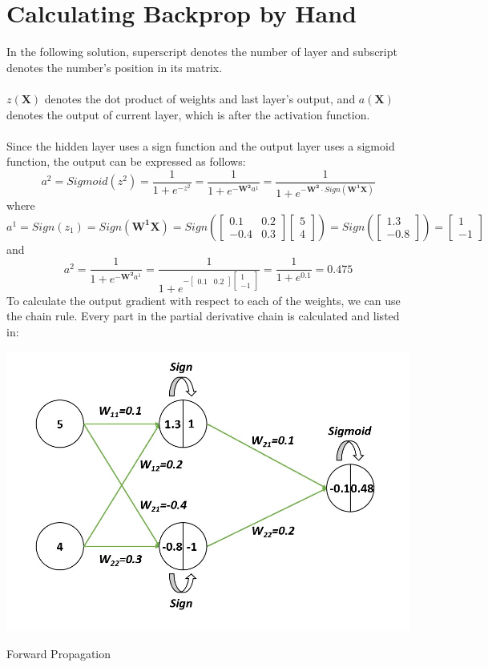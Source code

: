 \documentclass{article}
\begin{document}
    \section{Calculating Backprop by Hand}
    	In the following solution, superscript denotes the number of layer and subscript denotes the number's position in its matrix. \\\\
    	$z(\boldsymbol{X})$ denotes the dot product of weights and last layer's output, and $a(\boldsymbol{X})$ denotes the output of current layer, which is after the activation function.\\\\
    	Since the hidden layer uses a sign function and the output layer uses a sigmoid function, the output can be expressed as follows:
    	$$a^2=
    	Sigmoid(z^2)=
    	\dfrac{1}{1+e^{-z^2}}=
    	\dfrac{1}{1+e^{-\boldsymbol{W^2}a^1}}=
    	\dfrac{1}{1+e^{-\boldsymbol{W^2}\cdot Sign(\boldsymbol{W^1}\boldsymbol{X})}}$$
    	where
    	$$a^1=
    	Sign(z_1)=
    	Sign(\boldsymbol{W^1}\boldsymbol{X})=
    	Sign(\begin{bmatrix}0.1 & 0.2\\-0.4 & 0.3\end{bmatrix} \begin{bmatrix}5\\4\end{bmatrix})=
    	Sign(\begin{bmatrix}1.3\\-0.8\end{bmatrix})=
    	\begin{bmatrix}1\\-1\end{bmatrix}$$
    	and
    	$$a^2=
    	\dfrac{1}{1+e^{-\boldsymbol{W^2}a^1}}=
    	\dfrac{1}{1+e^{-\begin{bmatrix}0.1&0.2\end{bmatrix}\begin{bmatrix}1\\-1\end{bmatrix}}}=
    	\dfrac{1}{1+e^{0.1}}=0.475$$
    	To calculate the output gradient with respect to each of the weights, we can use the chain rule. Every part in the partial derivative chain is calculated and listed in:\\
    	\begin{minipage}[t]{\linewidth}
        		\captionsetup{type=figure}
               	\centering
               	\includegraphics[width=0.6\linewidth]
                				{images/Q2a.jpg}
                \caption{Forward Propagation}      
        \end{minipage}
\end{document}
